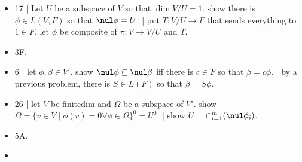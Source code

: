 \begin{itemize}
	\item 17 | Let $U$ be a subspace of $V$ so that $\dim V/U = 1$. show there is $\phi \in L(V,F)$ so that $\nul\phi = U$. | put $T: V/U \to F$ that sends everything to $1 \in F$. let $\phi$ be composite of $\pi: V \to V/U$ and $T$. 
	\item 3F. 
	\item 6 | let $\phi,\beta \in V'$. show $\nul\phi \subseteq \nul\beta$ iff there is $c \in F$ so that $\beta = c\phi$. | by a previous problem, there is $S \in L(F)$ so that $\beta = S\phi$. 
	\item 26 | let $V$ be finitedim and $\Omega$ be a subspace of $V'$. show $\Omega = \{v \in V \mid \phi(v)=0 \forall \phi \in \Omega\}^0 = U^0$. | show $U = \cap_{i=1}^{m} (\nul \phi_i)$. 
	\item 5A. 
	\item 
\end{itemize}


